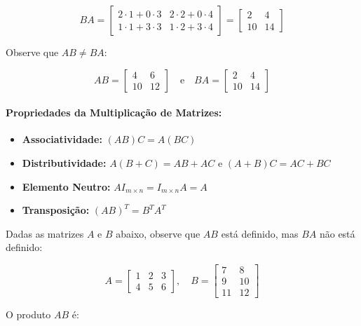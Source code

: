 \[
    BA = \begin{bmatrix}
        2 \cdot 1 + 0 \cdot 3 & 2 \cdot 2 + 0 \cdot 4 \\ 
        1 \cdot 1 + 3 \cdot 3 & 1 \cdot 2 + 3 \cdot 4
    \end{bmatrix} = \begin{bmatrix}
        2 & 4 \\ 
        10 & 14
    \end{bmatrix}
\]

\begin{center}
    Observe que $AB \neq BA$:
\end{center}
\[
    AB = \begin{bmatrix}
        4 & 6 \\ 
        10 & 12
    \end{bmatrix} \quad \text{e} \quad BA = \begin{bmatrix}
        2 & 4 \\ 
        10 & 14
    \end{bmatrix}
\]

\paragraph{Propriedades da Multiplicação de Matrizes:}

\begin{itemize}
    \item \textbf{Associatividade:} $(AB)C = A(BC)$
    \item \textbf{Distributividade:} $A(B + C) = AB + AC$ e $(A + B)C = AC + BC$
    \item \textbf{Elemento Neutro:} $AI_{m \times n} = I_{m \times n}A = A$
    \item \textbf{Transposição:} ${(AB)}^T = B^T A^T$
\end{itemize}

Dadas as matrizes $A$ e $B$ abaixo, observe que $AB$ está definido, mas $BA$ não está definido:

\[ 
    A = \begin{bmatrix}
        1 & 2 & 3 \\ 
        4 & 5 & 6
    \end{bmatrix}, \quad B = \begin{bmatrix}
        7 & 8 \\ 
        9 & 10 \\ 
        11 & 12
    \end{bmatrix}
\]

O produto $AB$ é:

